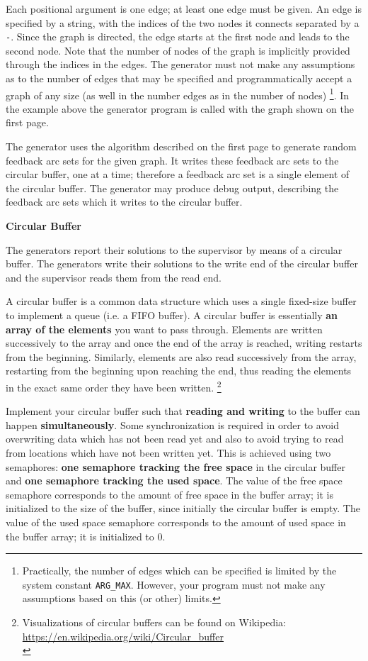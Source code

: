 Each positional argument is one edge; at least one edge must be given.
An edge is specified by a string,
with the indices of the two nodes it connects separated by a \texttt{-}.
Since the graph is directed,
the edge starts at the first node and leads to the second node.
Note that the number of nodes of the graph is implicitly provided
through the indices in the edges.
The generator must not make any assumptions as to the number of edges that may be specified
and programmatically accept a graph of any size
(as well in the number edges as in the number of nodes)
\footnote{
Practically, the number of edges which can be specified is limited by the system constant \texttt{ARG\_MAX}.
However, your program must not make any assumptions based on this (or other) limits.
}.
In the example above the generator program is called with the graph shown on the first page.

The generator uses the algorithm described on the first page
to generate random feedback arc sets for the given graph.
It writes these feedback arc sets to the circular buffer, one at a time;
therefore a feedback arc set is a single element of the circular buffer.
The generator may produce debug output,
describing the feedback arc sets which it writes to the circular buffer.

\clearpage
\textbf{Circular Buffer}

The generators report their solutions to the supervisor by means of a circular buffer.
The generators write their solutions to the write end of the circular buffer
and the supervisor reads them from the read end.

A circular buffer is a common data structure which uses a single fixed-size buffer
to implement a queue (i.e. a FIFO buffer).
A circular buffer is essentially \textbf{an array of the elements} you want to pass through.
Elements are written successively to the array
and once the end of the array is reached, writing restarts from the beginning.
Similarly, elements are also read successively from the array,
restarting from the beginning upon reaching the end,
thus reading the elements in the exact same order they have been written.
\footnote{
Visualizations of circular buffers can be found on Wikipedia:\\
\url{https://en.wikipedia.org/wiki/Circular_buffer}\\
}

Implement your circular buffer such that \textbf{reading and writing} to the buffer
can happen \textbf{simultaneously}.
Some synchronization is required
in order to avoid overwriting data which has not been read yet
and also to avoid trying to read from locations which have not been written yet.
This is achieved using two semaphores:
\textbf{one semaphore tracking the free space} in the circular buffer
and \textbf{one semaphore tracking the used space}.
The value of the free space semaphore corresponds to the amount of free space in the buffer array;
it is initialized to the size of the buffer, since initially the circular buffer is empty.
The value of the used space semaphore corresponds to the amount of used space in the buffer array;
it is initialized to 0.

